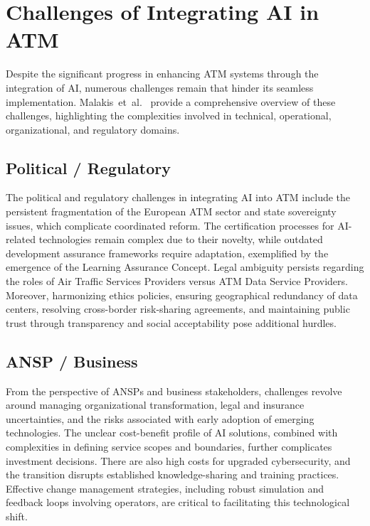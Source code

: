 \section{Challenges of Integrating AI in ATM}

Despite the significant progress in enhancing \gls{ATM} systems through the integration of \gls{AI}, numerous challenges remain that hinder its seamless implementation. 
Malakis~et~al.~\cite{Malakis_2022} provide a comprehensive overview of these challenges, highlighting the complexities involved in technical, operational, organizational, and regulatory domains. 


\subsection{Political / Regulatory}

The political and regulatory challenges in integrating \gls{AI} into \gls{ATM} include the persistent fragmentation of the European \gls{ATM} sector and state sovereignty issues, which complicate coordinated reform. 
The certification processes for \gls{AI}-related technologies remain complex due to their novelty, while outdated development assurance frameworks require adaptation, exemplified by the emergence of the Learning Assurance Concept. 
Legal ambiguity persists regarding the roles of Air Traffic Services Providers versus \gls{ATM} Data Service Providers. 
Moreover, harmonizing ethics policies, ensuring geographical redundancy of data centers, resolving cross-border risk-sharing agreements, and maintaining public trust through transparency and social acceptability pose additional hurdles.

\subsection{ANSP / Business}

From the perspective of \glspl{ANSP} and business stakeholders, challenges revolve around managing organizational transformation, legal and insurance uncertainties, and the risks associated with early adoption of emerging technologies. 
The unclear cost-benefit profile of \gls{AI} solutions, combined with complexities in defining service scopes and boundaries, further complicates investment decisions. 
There are also high costs for upgraded cybersecurity, and the transition disrupts established knowledge-sharing and training practices.
Effective change management strategies, including robust simulation and feedback loops involving operators, are critical to facilitating this technological shift.

